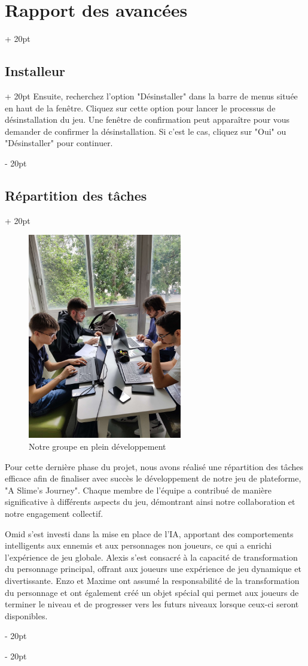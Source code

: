\documentclass[a4paper, 12pt, twoside]{article}
\newcommand{\ind}[1][20pt]{\advance\leftskip + #1}
\newcommand{\deind}[1][20pt]{\advance\leftskip - #1}
\newenvironment{indt}[2][20pt]{#2 \par \ind[#1]}{\par \deind} %
\begin{document}
\begin{indt}{\section{Rapport des avancées}}
\begin{indt}{\subsection{Installeur}}
            Ensuite, recherchez l'option "Désinstaller" dans la barre de menus située en haut de la fenêtre. Cliquez sur cette option pour lancer le processus de désinstallation du jeu. Une fenêtre de confirmation peut apparaître pour vous demander de confirmer la désinstallation. Si c'est le cas, cliquez sur "Oui" ou "Désinstaller" pour continuer.
        \end{indt}

        \newpage

        \begin{indt}{\subsection{Répartition des tâches}}
            \begin{figure}[h]
                \centering
                \includegraphics[width=0.6\textwidth]{Work.jpg}
                \caption{Notre groupe en plein développement}
                \label{fig:mesh1}
            \end{figure}

            Pour cette dernière phase du projet, nous avons réalisé une répartition des tâches efficace afin de finaliser avec succès le développement de notre jeu de plateforme, "A Slime's Journey". Chaque membre de l'équipe a contribué de manière significative à différents aspects du jeu, démontrant ainsi notre collaboration et notre engagement collectif.

            Omid s'est investi dans la mise en place de l'IA, apportant des comportements intelligents aux ennemis et aux personnages non joueurs, ce qui a enrichi l'expérience de jeu globale. Alexis s'est consacré à la capacité de transformation du personnage principal, offrant aux joueurs une expérience de jeu dynamique et divertissante. Enzo et Maxime ont assumé la responsabilité de la transformation du personnage et ont également créé un objet spécial qui permet aux joueurs de terminer le niveau et de progresser vers les futurs niveaux lorsque ceux-ci seront disponibles.


\end{indt}
\end{indt}
\end{document}
